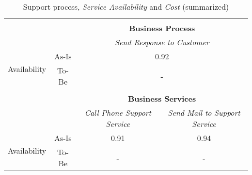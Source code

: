 \begin{table}[H]
\begin{tabular}{|c|c|p{2cm}|p{2.5cm}|p{2.5cm}|p{2.5cm}|}
		\multicolumn{6}{c}{} \\ \cline{3-6}
		\multicolumn{2}{c}{} & \multicolumn{4}{|c|}{\textbf{Business Process}} \\ \cline{3-6}
		\multicolumn{2}{c|}{} & \multicolumn{4}{|c|}{\textsl{Send Response to Customer}}\\ \hline
		\multirow{2}{*}{Availability} & As-Is & \multicolumn{4}{|c|}{0.92}\\ \cline{2-6}
									   & To-Be & \multicolumn{4}{|c|}{-}\\ \hline
		\multicolumn{6}{c}{} \\ \cline{3-6}
		\multicolumn{2}{c}{} & \multicolumn{4}{|c|}{\textbf{Business Services}} \\ \cline{3-6}
		\multicolumn{2}{c|}{} & \multicolumn{2}{|c|}{\textsl{Call Phone Support Service}} & \multicolumn{2}{|c|}{\textsl{Send Mail to Support Service}}\\ \hline
		\multirow{2}{*}{Availability} & As-Is & \multicolumn{2}{|c|}{0.91} & \multicolumn{2}{|c|}{0.94}\\ \cline{2-6}
									   & To-Be & \multicolumn{2}{|c|}{-} & \multicolumn{2}{|c|}{-}\\ \hline
	\end{tabular}
\caption{Support process, \textsl{Service Availability} and \textsl{Cost} (summarized)} 
\label{tab:support_both}
\end{table}